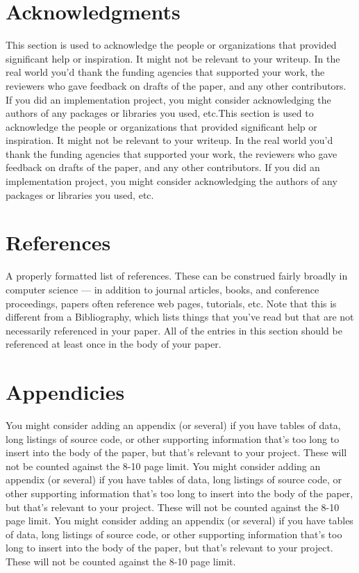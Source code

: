 \documentclass{acm_proc_article-sp}
\begin{document}
\section{Acknowledgments}
This section is used to acknowledge the people or organizations that provided significant help or inspiration. It might not be relevant to your writeup. In the real world you'd thank the funding agencies that supported your work, the reviewers who gave feedback on drafts of the paper, and any other contributors. If you did an implementation project, you might consider acknowledging the authors of any packages or libraries you used, etc.This section is used to acknowledge the people or organizations that provided significant help or inspiration. It might not be relevant to your writeup. In the real world you'd thank the funding agencies that supported your work, the reviewers who gave feedback on drafts of the paper, and any other contributors. If you did an implementation project, you might consider acknowledging the authors of any packages or libraries you used, etc.

\section{References}
A properly formatted list of references. These can be construed fairly broadly in computer science — in addition to journal articles, books, and conference proceedings, papers often reference web pages, tutorials, etc. Note that this is different from a Bibliography, which lists things that you've read but that are not necessarily referenced in your paper. All of the entries in this section should be referenced at least once in the body of your paper.

\section{Appendicies}
You might consider adding an appendix (or several) if you have tables of data, long listings of source code, or other supporting information that's too long to insert into the body of the paper, but that's relevant to your project. These will not be counted against the 8-10 page limit.
You might consider adding an appendix (or several) if you have tables of data, long listings of source code, or other supporting information that's too long to insert into the body of the paper, but that's relevant to your project. These will not be counted against the 8-10 page limit.
You might consider adding an appendix (or several) if you have tables of data, long listings of source code, or other supporting information that's too long to insert into the body of the paper, but that's relevant to your project. These will not be counted against the 8-10 page limit.
\end{document}
